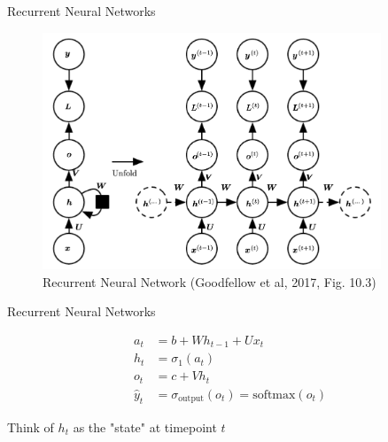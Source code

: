 \documentclass[10pt]{beamer}
\begin{document}
\begin{frame}{Recurrent Neural Networks}

\begin{figure}[h]
\centering
\includegraphics[width=0.9\textwidth]{fig/DL_10_3_RNN.png}
\caption{Recurrent Neural Network (Goodfellow et al, 2017, Fig. 10.3)}
\end{figure}

\end{frame}


\begin{frame}{Recurrent Neural Networks}

\begin{align*}
a_t &= b + W h_{t-1} + U x_t \\
h_t &= \sigma_1(a_t) \\
o_t &= c + V h_{t} \\
\hat{y}_t & = \sigma_{\text{output}}(o_t) = \text{softmax}(o_t)
\end{align*}

Think of $h_t$ as the "state" at timepoint $t$

\end{frame}
\end{document}
